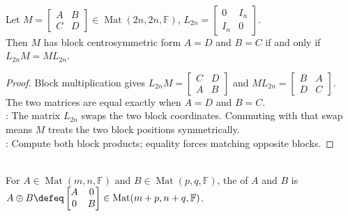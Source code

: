 \begin{proposition} \label{prop:block-centrosymmetric-commutation} \\
Let $M=
\begin{bmatrix}
A & B\\
C & D
\end{bmatrix}\in\operatorname{Mat}(2n,2n,\mathbb{F})$,
$L_{2n}=
\begin{bmatrix}
0 & I_n\\
I_n & 0
\end{bmatrix}$.\\
Then $M$ has block centrosymmetric form $A=D$ and $B=C$ if and only if $L_{2n}M=ML_{2n}$.
\begin{proof}
Block multiplication gives $L_{2n}M=
\begin{bmatrix}
C & D\\
A & B
\end{bmatrix}$ and 
$ML_{2n}=
\begin{bmatrix}
B & A\\
D & C
\end{bmatrix}$.\\
The two matrices are equal exactly when $A=D$ and $B=C$.\\
: The matrix $L_{2n}$ swaps the two block coordinates. Commuting with that swap means $M$ treats the two block positions symmetrically.\\
: Compute both block products; equality forces matching opposite blocks.
\end{proof}
\end{proposition}

\begin{definition} \\
For $A\in\operatorname{Mat}(m,n,\mathbb{F})$ and $B\in\operatorname{Mat}(p,q,\mathbb{F})$, the  of $A$ and $B$ is $A\oplus B\defeq
\begin{bmatrix}
A & 0\\
0 & B
\end{bmatrix}
\in\operatorname{Mat}(m+p,n+q,\mathbb{F})$.
\end{definition}
